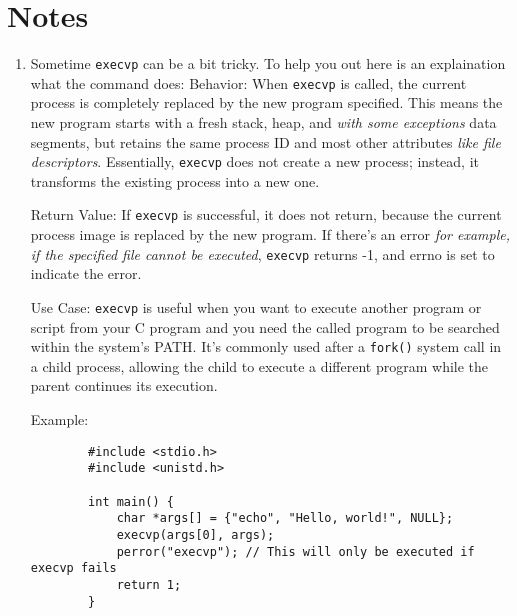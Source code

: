 \documentclass{dcbl/challenge}
\begin{document}
\section*{Notes}
\begin{enumerate}
    \item Sometime \texttt{execvp} can be a bit tricky. To help you out here is an explaination what the command does:
    Behavior: When \texttt{execvp} is called, the current process is completely replaced by the new program specified. This means the new program starts with a fresh stack, heap, and \textit{with some exceptions} data segments, but retains the same process ID and most other attributes \textit{like file descriptors}. Essentially, \texttt{execvp} does not create a new process; instead, it transforms the existing process into a new one.

    Return Value: If \texttt{execvp} is successful, it does not return, because the current process image is replaced by the new program. If there's an error \textit{for example, if the specified file cannot be executed}, \texttt{execvp} returns -1, and errno is set to indicate the error.
    
    Use Case: \texttt{execvp} is useful when you want to execute another program or script from your C program and you need the called program to be searched within the system's PATH. It's commonly used after a \texttt{fork()} system call in a child process, allowing the child to execute a different program while the parent continues its execution.

    Example: 
    \begin{verbatim}
        #include <stdio.h>
        #include <unistd.h>

        int main() {
            char *args[] = {"echo", "Hello, world!", NULL};
            execvp(args[0], args);
            perror("execvp"); // This will only be executed if execvp fails
            return 1;
        }
    \end{verbatim}

\end{enumerate}
\end{document}
